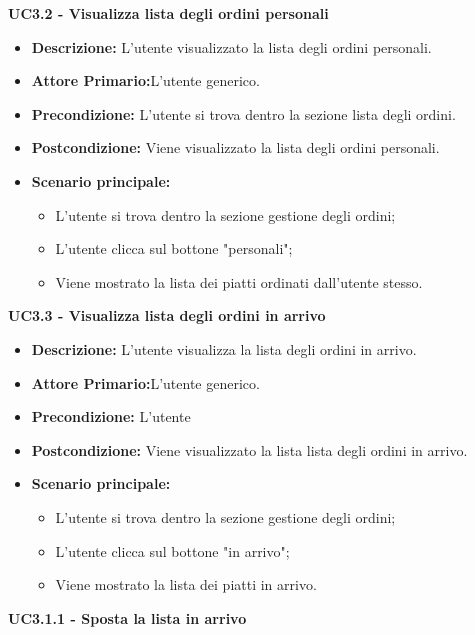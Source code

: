 \textbf{UC3.2 - Visualizza lista degli ordini personali}
\begin{itemize}
    \item \textbf{Descrizione:} L'utente visualizzato la lista degli ordini personali.
    \item \textbf{Attore Primario:}L'utente generico.
    \item \textbf{Precondizione:} L'utente si trova dentro la sezione lista degli ordini.
    \item \textbf{Postcondizione:} Viene visualizzato la lista degli ordini personali.
    \item \textbf{Scenario principale:}
    \begin{itemize}
        \item L'utente si trova dentro la sezione gestione degli ordini;
        \item L'utente clicca sul bottone "personali";
        \item Viene mostrato la lista dei piatti ordinati dall'utente stesso.
    \end{itemize}
\end{itemize}
\textbf{UC3.3 - Visualizza lista degli ordini in arrivo}
\begin{itemize}
    \item \textbf{Descrizione:} L'utente visualizza la lista degli ordini in arrivo.
    \item \textbf{Attore Primario:}L'utente generico.
    \item \textbf{Precondizione:} L'utente 
    \item \textbf{Postcondizione:} Viene visualizzato la lista lista degli ordini in arrivo.
    \item \textbf{Scenario principale:}
    \begin{itemize}
        \item L'utente si trova dentro la sezione gestione degli ordini;
        \item L'utente clicca sul bottone "in arrivo";
        \item Viene mostrato la lista dei piatti in arrivo.
    \end{itemize}
\end{itemize}
\textbf{UC3.1.1 - Sposta la lista in arrivo}
